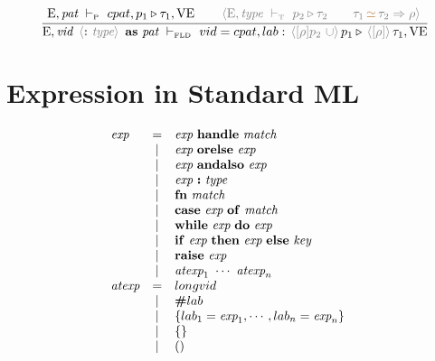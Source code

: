 \documentclass[11pt,a4paper]{article}
\newcommand{\key}[1]{\textrm{\textbf{#1}}}
\newcommand{\prodlhs}[1]{\textit{#1}}
\newcommand{\qualtype}[2]{#1 \triangleright #2}
\newcommand{\unify}[3]{#1\,{\color{brown}{\simeq}}\,#2 \Rightarrow #3}
\newcommand{\braced}[1]{\{#1\}}
\newcommand{\angled}[1]{\,{\color{gray}\langle#1\rangle}\,}
\newcommand{\Env}  {\textrm{E}}
\newcommand{\VE}   {\textrm{VE}}
\newcommand{\vdashP}  {\ \vdash_{\textrm{\tiny P}}\  }
\newcommand{\vdashT}  {\ \vdash_{\textrm{\tiny T}}\  }
\newcommand{\vdashFLD}{\ \vdash_\textrm{\tiny FLD}\  }
\begin{document}
\[
\cfrac
 {\Env,\prodlhs{pat}  \vdashP cpat,\qualtype{p_1}{\tau_1}, \VE      \qquad
  \angled{\Env,\prodlhs{type} \vdashT \qualtype{p_2}{\tau_2}        \qquad
  \unify{\tau_1}{\tau_2}{\rho}}}
 {\Env, \prodlhs{vid}\ \angled{\key{:}\ \prodlhs{type}}\ \key{as}\ \prodlhs{pat}  \vdashFLD 
    vid=cpat, lab:\qualtype{\angled{[\rho]p_2\ \cup} p_1}{\angled{[\rho]}\tau_1}, \VE }
\]

\section {Expression in Standard ML}
{\renewcommand{\arraystretch}{1.2}\[
\begin{array}{lcll}
\prodlhs{exp}
    & = & \prodlhs{exp}\ \key{handle}\ \prodlhs{match}                              &\\        
    & | & \prodlhs{exp}\ \key{orelse}\ \prodlhs{exp}                                &\\
    & | & \prodlhs{exp}\ \key{andalso}\ \prodlhs{exp}                               &\\
    & | & \prodlhs{exp}\ \key{:}\ \prodlhs{type}                                    &\\
    & | & \key{fn}\ \prodlhs{match}                                                 &\\
    & | & \key{case}\ \prodlhs{exp}\ \key{of}\ \prodlhs{match}                      &\\
    & | & \key{while}\ \prodlhs{exp}\ \key{do}\ \prodlhs{exp}                       &\\
    & | & \key{if}\ \prodlhs{exp}\ \key{then}\ \prodlhs{exp}\ \key{else}\ \prodlhs{key} &\\
    & | & \key{raise}\ \prodlhs{exp}                                                &\\
    & | & \prodlhs{atexp}_1\ \cdots\ \prodlhs{atexp}_n                              &\\
\prodlhs{atexp}
    & = & longvid                                                                   &\\
    & | & \key{\#}lab                                                               &\\
    & | & \braced{lab_1=\prodlhs{exp}_1,\cdots,lab_n=\prodlhs{exp}_n}               &\\
    & | & \braced{}                                                                 &\\
    & | & ()                                                                        &\\

\end{array}\]}
\end{document}
